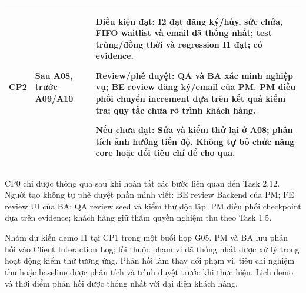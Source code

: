\begin{table}[H]
\begin{tabularx}{\linewidth}{|p{0.9cm}|p{2.5cm}|>{\raggedright\arraybackslash}X|}
CP2 & Sau A08, trước A09/A10 & \textbf{Điều kiện đạt:} I2 đạt đăng ký/hủy, sức chứa, FIFO waitlist và email đã thống nhất; test trùng/đồng thời và regression I1 đạt; có evidence. \par \textbf{Review/phê duyệt:} QA và BA xác minh nghiệp vụ; BE review đăng ký/email của PM. PM điều phối chuyển increment dựa trên kết quả kiểm tra; quy tắc chưa rõ trình khách hàng. \par \textbf{Nếu chưa đạt:} Sửa và kiểm thử lại ở A08; phân tích ảnh hưởng tiến độ. Không tự bỏ chức năng core hoặc đổi tiêu chí để cho qua. \\ \hline
\end{tabularx}
\end{table}

\noindent CP0 chỉ được thông qua sau khi hoàn tất các bước liên quan đến Task 2.12. Người tạo không tự phê duyệt phần mình viết: BE review Backend của PM; FE review UI của BA; QA review seed và kiểm thử độc lập. PM điều phối checkpoint dựa trên evidence; khách hàng giữ thẩm quyền nghiệm thu theo Task 1.5.

\medskip
\noindent Nhóm dự kiến demo I1 tại CP1 trong một buổi họp G05. PM và BA lưu phản hồi vào Client Interaction Log; lỗi thuộc phạm vi đã thống nhất được xử lý trong hoạt động kiểm thử tương ứng. Phản hồi làm thay đổi phạm vi, tiêu chí nghiệm thu hoặc baseline được phân tích và trình duyệt trước khi thực hiện. Lịch demo và thời điểm phản hồi được thống nhất với đại diện khách hàng.
\newpage
